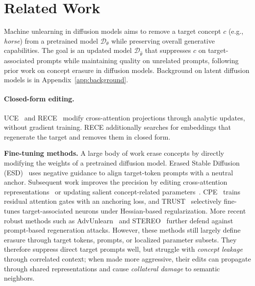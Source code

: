 \section{Related Work}
\label{sec:background}

Machine unlearning in diffusion models aims to remove a target concept $c$ (e.g., \textit{horse}) from a pretrained model $\mathcal{D}_\theta$
while preserving overall generative capabilities. The goal is an updated model $\mathcal{D}_{\hat{\theta}}$ that suppresses $c$ on target-associated prompts while maintaining quality on unrelated prompts, following prior work on concept erasure in diffusion models. Background on latent diffusion models is in Appendix~\ref{app:background}.

\paragraph{Closed-form editing.} UCE~\citep{gandikota2024unified} and RECE~\citep{gong2024reliable} modify cross-attention projections through analytic updates, without gradient training. RECE additionally searches for embeddings that regenerate the target and removes them in closed form.

\textbf{Fine-tuning methods.}
A large body of work erase concepts by directly modifying the weights of a pretrained diffusion model. Erased Stable Diffusion (ESD)~\cite{gandikota2023erasing} uses negative guidance to align target-token prompts with a neutral anchor. Subsequent work improves the precision by editing cross-attention representations~\citep{wang2025ace} or updating salient concept-related parameters~\citep{fan2023salun,wu2024scissorhands}. CPE~\citep{lee2025concept} trains residual attention gates with an anchoring loss, and TRUST~\citep{kori2026selective} selectively fine-tunes target-associated neurons under Hessian-based regularization. More recent robust methods such as AdvUnlearn~\cite{zhang2024defensive} and STEREO~\cite{srivatsan2025stereo} further defend against prompt-based regeneration attacks.
However, these methods still largely define erasure through target tokens, prompts, or localized parameter subsets. They therefore suppress direct target prompts well, but struggle with \emph{concept leakage} through correlated context; when made more aggressive, their edits can propagate through shared representations and cause \emph{collateral damage} to semantic neighbors.

